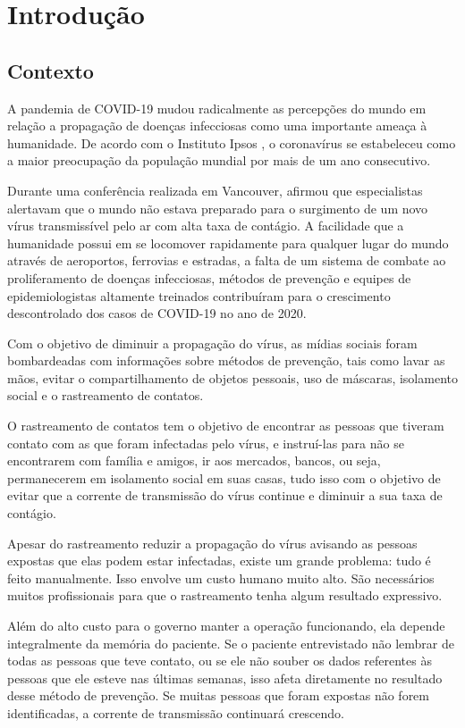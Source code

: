 \chapter{Introdução}\label{chp:Introducao}

\section{Contexto}\label{sec:contexto}
A pandemia de COVID-19 mudou radicalmente as percepções do mundo em relação a propagação de doenças infecciosas como uma importante ameaça à humanidade. De acordo com o Instituto Ipsos \cite{Gebrekal2021}, o coronavírus se estabeleceu como a maior preocupação da população mundial por mais de um ano consecutivo.

Durante uma conferência realizada em Vancouver, \textcite{Gates2015} afirmou que especialistas alertavam que o mundo não estava preparado para o surgimento de um novo vírus transmissível pelo ar com alta taxa de contágio. A facilidade que a humanidade possui em se locomover rapidamente para qualquer lugar do mundo através de aeroportos, ferrovias e estradas, a falta de um sistema de combate ao proliferamento de doenças infecciosas, métodos de prevenção e equipes de epidemiologistas altamente treinados contribuíram para o crescimento descontrolado dos casos de COVID-19 no ano de 2020.

Com o objetivo de diminuir a propagação do vírus, as mídias sociais foram bombardeadas com informações sobre métodos de prevenção, tais como lavar as mãos, evitar o compartilhamento de objetos pessoais, uso de máscaras, isolamento social e o rastreamento de contatos.

O rastreamento de contatos tem o objetivo de encontrar as pessoas que tiveram contato com as que foram infectadas pelo vírus, e instruí-las para não se encontrarem com família e amigos, ir aos mercados, bancos, ou seja, permanecerem em isolamento social em suas casas, tudo isso com o objetivo de evitar que a corrente de transmissão do vírus continue e diminuir a sua taxa de contágio.

Apesar do rastreamento reduzir a propagação do vírus avisando as pessoas expostas que elas podem estar infectadas, existe um grande problema: tudo é feito manualmente. Isso envolve um custo humano muito alto. São necessários muitos profissionais para que o rastreamento tenha algum resultado expressivo.

Além do alto custo para o governo manter a operação funcionando, ela depende integralmente da memória do paciente. Se o paciente entrevistado não lembrar de todas as pessoas que teve contato, ou se ele não souber os dados referentes às pessoas que ele esteve nas últimas semanas, isso afeta diretamente no resultado desse método de prevenção. Se muitas pessoas que foram expostas não forem identificadas, a corrente de transmissão continuará crescendo.


